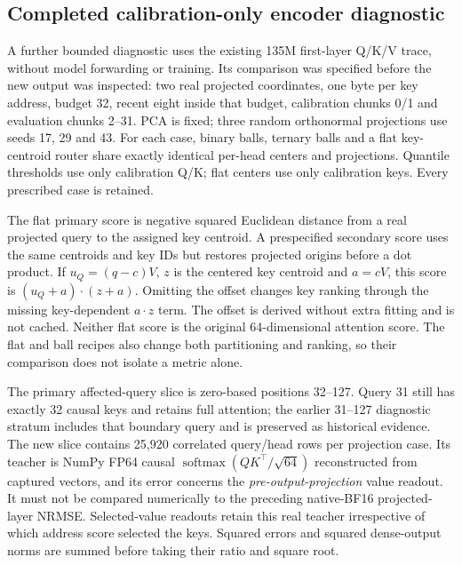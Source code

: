 \documentclass[11pt]{article}
\begin{document}
\subsection{Completed calibration-only encoder diagnostic}

A further bounded diagnostic uses the existing 135M first-layer Q/K/V trace,
without model forwarding or training. Its comparison was specified before
the new output was inspected: two real projected coordinates, one byte per key
address, budget 32, recent eight inside that budget, calibration chunks 0/1
and evaluation chunks 2--31. PCA is fixed; three random orthonormal projections
use seeds 17, 29 and 43. For each case, binary balls, ternary balls and a flat
key-centroid router share exactly identical per-head centers and projections.
Quantile thresholds use only calibration Q/K; flat centers use only calibration
keys. Every prescribed case is retained.

The flat primary score is negative squared Euclidean distance from a real
projected query to the assigned key centroid. A prespecified secondary score
uses the same centroids and key IDs but restores projected origins before a
dot product. If \(u_Q=(q-c)V\), \(z\) is the centered key centroid and \(a=cV\),
this score is \((u_Q+a)\cdot(z+a)\). Omitting the offset changes key ranking
through the missing key-dependent \(a\cdot z\) term. The offset is derived
without extra fitting and is not cached. Neither flat score is the original
64-dimensional attention score. The flat and ball recipes also change both
partitioning and ranking, so their comparison does not isolate a metric alone.

The primary affected-query slice is zero-based positions 32--127. Query 31
still has exactly 32 causal keys and retains full attention; the earlier
31--127 diagnostic stratum includes that boundary query and is preserved as
historical evidence. The new slice contains 25,920 correlated query/head rows
per projection case. Its teacher is NumPy FP64 causal
\(\operatorname{softmax}(QK^\top/\sqrt{64})\) reconstructed from captured vectors,
and its error concerns the \emph{pre-output-projection} value readout.
It must not be compared numerically to the preceding native-BF16 projected-layer
NRMSE. Selected-value readouts retain this real teacher irrespective of which
address score selected the keys. Squared errors and squared dense-output norms
are summed before taking their ratio and square root.
\end{document}
